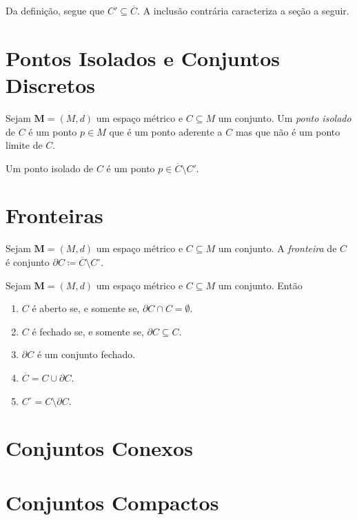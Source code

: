 Da definição, segue que $C' \subseteq \overline C$. A inclusão contrária caracteriza a seção a seguir.

\section{Pontos Isolados e Conjuntos Discretos}

\begin{defi}
	Sejam $\bm M = (M,d)$ um espaço métrico e $C \subseteq M$ um conjunto. Um \emph{ponto isolado} de $C$ é um ponto $p \in M$ que é um ponto aderente a $C$ mas que não é um ponto limite de $C$.
\end{defi}

	Um ponto isolado de $C$ é um ponto $p \in \overline C \setminus C'$.

\section{Fronteiras}

\begin{defi}
	Sejam $\bm M = (M,d)$ um espaço métrico e $C \subseteq M$ um conjunto. A \emph{fronteira} de $C$ é conjunto $\partial C \coloneqq \overline C \setminus C^\circ$.
\end{defi}

\begin{prop}
	Sejam $\bm M = (M,d)$ um espaço métrico e $C \subseteq M$ um conjunto. Então
	\begin{enumerate}
	\item $C$ é aberto se, e somente se, $\partial C \cap C = \emptyset$.
	\item $C$ é fechado se, e somente se, $\partial C \subseteq C$.
	\item $\partial C$ é um conjunto fechado.
	\item $\overline C = C \cup \partial C$.
	\item $C^\circ = C \setminus \partial C$.
	\end{enumerate}
\end{prop}

\section{Conjuntos Conexos}

\section{Conjuntos Compactos}